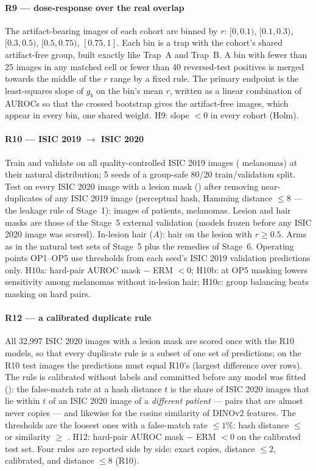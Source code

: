 \paragraph{R9 --- dose-response over the real overlap} The artifact-bearing images of each cohort are binned by $r$:
$[0,0.1)$, $[0.1,0.3)$, $[0.3,0.5)$, $[0.5,0.75)$, $[0.75,1]$. Each bin is a trap with the cohort's shared artifact-free
group, built exactly like Trap~A and Trap~B. A bin with fewer than 25 images in any matched cell or fewer than 40
reversed-test positives is merged towards the middle of the $r$ range by a fixed rule. The primary endpoint is the
least-squares slope of $g_b$ on the bin's mean $r$, written as a linear combination of AUROCs so that the crossed bootstrap
gives the artifact-free images, which appear in every bin, one shared weight. H9: slope $<0$ in every cohort (Holm).
\paragraph{R10 --- ISIC 2019 $\to$ ISIC 2020} Train and validate on all \sSevenIsicTwoZeroOneNineTrainValImages{}
quality-controlled ISIC 2019 images (\sSevenIsicTwoZeroOneNineMelanomas{} melanomas) at their natural distribution; 5 seeds
of a group-safe 80/20 train/validation split. Test on every ISIC 2020 image \citep{rotemberg2021isic2020} with a lesion mask
(\sSevenIsicTwoZeroTwoZeroWithLesionMask) after removing near-duplicates of any ISIC 2019 image (perceptual hash, Hamming
distance $\le8$ --- the leakage rule of Stage~1): \sSevenTestImages{} images of \sSevenTestPatients{} patients,
\sSevenTestMelanomas{} melanomas. Lesion and hair masks are those of the Stage~5 external validation (models frozen before
any ISIC 2020 image was scored). In-lesion hair ($A$): hair on the lesion with $r\ge0.5$. Arms as in the natural test
sets of Stage~5 plus the remedies of Stage~6. Operating points OP1--OP5 use thresholds from each seed's ISIC 2019
validation predictions only. H10a: hard-pair AUROC mask $-$ ERM $<0$; H10b: at OP5 masking lowers sensitivity among
melanomas without in-lesion hair; H10c: group balancing beats masking on hard pairs.
\paragraph{R12 --- a calibrated duplicate rule} All 32{,}997 ISIC 2020 images with a lesion mask are scored once with the
R10 models, so that every duplicate rule is a subset of one set of predictions; on the R10 test images the predictions
must equal R10's (largest difference \sSevenMatchMax{} over \sSevenMatchRows{} rows). The rule is calibrated without labels
and committed before any model was fitted (\sSevenCommitCal): the false-match rate at a hash distance $t$ is the share of
ISIC 2020 images that lie within $t$ of an ISIC 2020 image of a \emph{different patient} --- pairs that are almost never
copies --- and likewise for the cosine similarity of DINOv2 features. The thresholds are the loosest ones with a false-match
rate $\le1\%$: hash distance $\le$ \sSevenTstar{} or similarity $\ge$ \sSevenCstar. H12: hard-pair AUROC mask $-$ ERM $<0$ on
the calibrated test set. Four rules are reported side by side: exact copies, distance $\le2$, calibrated, and distance
$\le8$ (R10).
